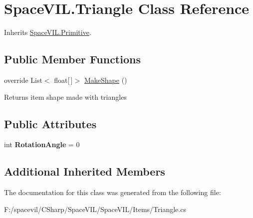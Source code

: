 \hypertarget{class_space_v_i_l_1_1_triangle}{}\section{Space\+V\+I\+L.\+Triangle Class Reference}
\label{class_space_v_i_l_1_1_triangle}


Inherits \mbox{\hyperlink{class_space_v_i_l_1_1_primitive}{Space\+V\+I\+L.\+Primitive}}.

\subsection*{Public Member Functions}
\begin{DoxyCompactItemize}
\item 
\mbox{\label{class_space_v_i_l_1_1_triangle_a454090bb2cb1e8635643fce5ecfd7e7c}} 
override List$<$ float\mbox{[}$\,$\mbox{]}$>$ \mbox{\hyperlink{class_space_v_i_l_1_1_triangle_a454090bb2cb1e8635643fce5ecfd7e7c}{Make\+Shape}} ()
\begin{DoxyCompactList}\small\item\em \begin{DoxyReturn}{Returns}
item shape made with triangles 
\end{DoxyReturn}
\end{DoxyCompactList}\end{DoxyCompactItemize}
\subsection*{Public Attributes}
\begin{DoxyCompactItemize}
\item 
\mbox{\label{class_space_v_i_l_1_1_triangle_a8c1e0b5f117270be3c982cdd7753a911}} 
int {\bfseries Rotation\+Angle} = 0
\end{DoxyCompactItemize}
\subsection*{Additional Inherited Members}


The documentation for this class was generated from the following file\+:\begin{DoxyCompactItemize}
\item 
F\+:/spacevil/\+C\+Sharp/\+Space\+V\+I\+L/\+Space\+V\+I\+L/\+Items/Triangle.\+cs\end{DoxyCompactItemize}
